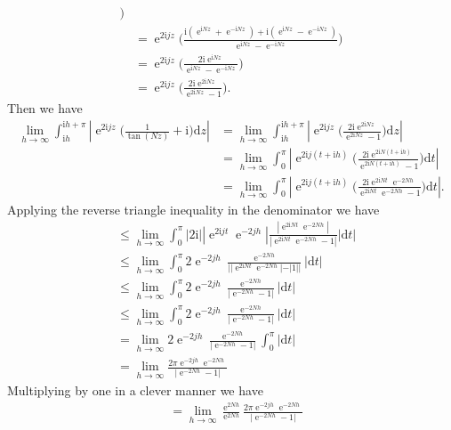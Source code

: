 \documentclass[10pt]{amsart}
\newcommand{\D}{\mathrm{d}}
\newcommand{\I}{\mathrm{i}}
\DeclareMathOperator{\E}{e}
\theoremstyle{nonumberplain}
\begin{document}
\begin{enumerate}[label={\bf {\arabic*}:}]
\begin{align*}
	\bigg) \\
	&= \E^{2 \I jz} \bigg( \frac{\I \left( \E^{\I N z} + \E^{-\I N z} \right) + \I\left( \E^{\I N z} - \E^{-\I N z} \right)}{ \E^{\I N z} - \E^{-\I N z} } \bigg) \\
	&= \E^{2 \I jz} \bigg( \frac{ 2 \I \E^{\I N z} }{ \E^{\I N z} - \E^{-\I N z} } \bigg) \\
	&= \E^{2 \I jz} \bigg( \frac{ 2 \I \E^{2 \I N z} }{ \E^{2 \I N z} - 1 } \bigg).
\end{align*}
Then we have
\begin{align*}
\lim_{h \to \infty} \int_{\I h}^{\I h + \pi} \left| \E^{2 \I jz} \bigg( \frac 1 {\tan (N z)} + \I \bigg) \D z \right|
	&= \lim_{h \to \infty} \int_{\I h}^{\I h + \pi} \left| \E^{2 \I jz}
		\bigg( \frac{ 2 \I \E^{2 \I N z} }{ \E^{2 \I N z} - 1 } \bigg) \D z \right| \\
	&= \lim_{h \to \infty} \int_0^\pi \left| \E^{2 \I j(t + \I h)}
		\bigg( \frac{ 2 \I \E^{2 \I N (t + \I h)} }{ \E^{2 \I N (t + \I h)} - 1 } \bigg) \D t \right| \\
	&= \lim_{h \to \infty} \int_0^\pi \left| \E^{2 \I j(t + \I h)}
		\bigg( \frac{ 2 \I \E^{2 \I N t}\E^{- 2 N h} }{ \E^{2 \I N t}\E^{- 2 N h} - 1 } \bigg) \D t \right|.
\end{align*}
Applying the reverse triangle inequality in the denominator we have
\begin{align*}
	&\leq \lim_{h \to \infty} \int_0^\pi | 2 \I | \left| \E^{2 \I j t}\E^{- 2 j h} \right|
		\frac{ | \E^{2 \I N t}\E^{- 2 N h} |}{| \E^{2 \I N t}\E^{- 2 N h} - 1 |} | \D t | \\
	&\leq \lim_{h \to \infty} \int_0^\pi 2 \E^{- 2 j h}
		\frac{ \E^{- 2 N h} }{| |\E^{2 \I N t}\E^{- 2 N h}| - |1| |} | \D t | \\
	&\leq \lim_{h \to \infty} \int_0^\pi 2 \E^{- 2 j h}
		\frac{ \E^{- 2 N h} }{| \E^{- 2 N h} - 1 |} | \D t | \\
	&\leq \lim_{h \to \infty} \int_0^\pi 2 \E^{- 2 j h}
		\frac{ \E^{- 2 N h} }{| \E^{- 2 N h} - 1 |} | \D t | \\
	&= \lim_{h \to \infty} 2 \E^{- 2 j h}
		\frac{ \E^{- 2 N h} }{| \E^{- 2 N h} - 1 |} \int_0^\pi | \D t | \\
	&= \lim_{h \to \infty}
		\frac{ 2 \pi \E^{- 2 j h} \E^{- 2 N h} }{| \E^{- 2 N h} - 1 |}
\end{align*}
Multiplying by one in a clever manner we have
\begin{align*}
&= \lim_{h \to \infty} \frac {\E^{ 2 N h}} {\E^{ 2 N h}} \frac{ 2 \pi \E^{- 2 j h} \E^{- 2 N h} }{| \E^{- 2 N h} - 1 |} \\

\end{align*}
\end{enumerate}
\end{document}
